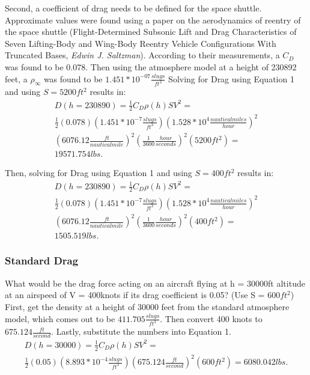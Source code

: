 \documentclass[12pt]{report}
\begin{document}
Second, a coefficient of drag needs to be defined for the space shuttle. Approximate values were found using a paper on the aerodynamics of reentry of the space shuttle (Flight-Determined Subsonic Lift and Drag Characteristics of Seven Lifting-Body and Wing-Body Reentry Vehicle Configurations With Truncated Bases, \emph{Edwin J. Saltzman}). According to their measurements, a \(C_{D}\) was found to be 0.078.
Then using the atmosphere model at a height of 230892 feet, a \(\rho_{\infty}\) was found to be \(1.451*10^{-07} \frac{slugs}{ft^3}\)
\newline
\newline
Solving for Drag using Equation 1 and using \(S = 5200 ft^2\) results in:
\begin{equation}
\begin{split}
	D(h = 230890) = \frac{1}{2}C_{D}\rho(h)SV^2 = \\
	\frac{1}{2}(0.078)(1.451*10^{-7} \frac{slugs}{ft^3})
	(1.528 * 10^4 \frac{nautical miles}{hour})^2 \\
	(6076.12 \frac{ft}{nautical mile})^2(\frac{1}{3600} \frac{hour}{seconds})^2 (5200 ft^2) = 
	\\19571.754 lbs.
	\label{equation:shuttleDrag1}
\end{split}
\end{equation}

Then, solving for Drag using Equation 1 and using \(S = 400 ft^2\) results in:
\begin{equation}
\begin{split}
	D(h = 230890) = \frac{1}{2}C_{D}\rho(h)SV^2 = \\
	\frac{1}{2}(0.078)(1.451*10^{-7} \frac{slugs}{ft^3})
	(1.528 * 10^4 \frac{nautical miles}{hour})^2 \\
	(6076.12 \frac{ft}{nautical mile})^2(\frac{1}{3600} \frac{hour}{seconds})^2 (400 ft^2) = 
	\\1505.519 lbs.
	\label{equation:shuttleDrag1}
\end{split}
\end{equation}


\subsubsection{Standard Drag}
What would be the drag force acting on an aircraft flying at h = 30000ft altitude at an airspeed of V = 400knots if its drag coefficient is 0.05? (Use S = 600\(ft^2\)) 
\newline
\newline
First, get the density at a height of 30000 feet from the standard atmosphere model, which comes out to be \(411.705 \frac{slugs}{ft^3}\). Then convert 400 knots to \(675.124 \frac{ft}{second}\). Lastly, substitute the numbers into Equation 1.
\begin{equation}
\begin{split}
	D(h = 30000) = \frac{1}{2}C_{D}\rho(h)SV^2 = \\
	\frac{1}{2}(0.05)(8.893 * 10^{-4} \frac{slugs}{ft^3})
	(675.124 \frac{ft}{second})^2 (600 ft^2) =  6080.042 lbs.
	\label{equation:standardDrag}
\end{split}
\end{equation}
\end{document}
